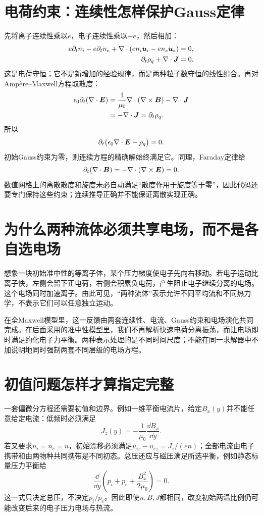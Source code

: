 \section{电荷约束：连续性怎样保护Gauss定律}
先将离子连续性乘以$e$，电子连续性乘以$-e$，然后相加：
\begin{align}
 e\partial_tn_i-e\partial_tn_e
 +\nabla\cdot(en_i\bm{u}_i-en_e\bm{u}_e)&=0,\\
 \partial_t\rho_q+\nabla\cdot\bm{J}&=0.
 \label{hall:eq:charge-conservation}
\end{align}
这是电荷守恒；它不是新增加的经验规律，而是两种粒子数守恒的线性组合。再对Ampère--Maxwell方程取散度：
\begin{align}
 \epsilon_0\partial_t(\nabla\cdot\bm{E})
 &=\frac1{\mu_0}\nabla\cdot(\nabla\times\bm{B})-\nabla\cdot\bm{J}\\
 &=-\nabla\cdot\bm{J}=\partial_t\rho_q.
\end{align}
所以
\begin{equation}
\partial_t\bigl(\epsilon_0\nabla\cdot\bm{E}-\rho_q\bigr)=0.
\end{equation}
初始Gauss约束为零，则连续方程的精确解始终满足它。同理，Faraday定律给
\begin{equation}
\partial_t(\nabla\cdot\bm{B})=-\nabla\cdot(\nabla\times\bm{E})=0.
\end{equation}
数值网格上的离散散度和旋度未必自动满足“散度作用于旋度等于零”，因此代码还要专门保持这些约束；连续推导正确并不能保证离散实现正确。

\section{为什么两种流体必须共享电场，而不是各自选电场}
想象一块初始准中性的等离子体，某个压力梯度使电子先向右移动。若电子运动比离子快，左侧会留下正电荷，右侧会积累负电荷，产生阻止电子继续分离的电场。这个电场同时加速离子。由此可见，“两种流体”表示允许不同平均流和不同热力学，不表示它们可以任意独立运动。

在全Maxwell模型里，这一反馈由两套连续性、电流、Gauss约束和电场演化共同完成。在后面采用的准中性模型里，我们不再解析快速电荷分离振荡，而让电场即时满足约化电子力平衡。两种表示处理的是不同时间尺度；不能在同一求解器中不加说明地同时强制两套不同层级的电场方程。

\section{初值问题怎样才算指定完整}
一套偏微分方程还需要初值和边界。例如一维平衡电流片，给定$B_x(y)$并不能任意给定电流：低频时必须满足
\begin{equation}
 J_z(y)=-\frac1{\mu_0}\frac{\dd B_x}{\dd y}.
\end{equation}
若又要求$n_i=n_e=n$，初始漂移必须满足$u_{iz}-u_{ez}=J_z/(en)$；全部电流由电子携带和由两物种共同携带是不同初态。总压还应与磁压满足所选平衡，例如静态标量压力平衡给
\begin{equation}
\frac{\dd}{\dd y}\left(p_i+p_e+\frac{B_x^2}{2\mu_0}\right)=0.
\end{equation}
这一式只决定总压，不决定$p_i/p_e$。因此即使$n,B,J$都相同，改变初始两温比例仍可能改变后来的电子压力电场与热流。

